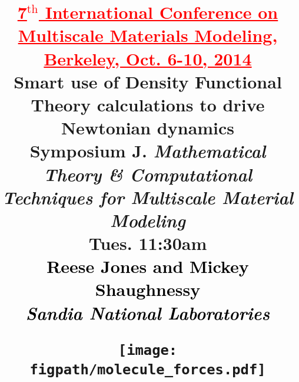 \documentclass{beamer}
\newcommand{\figpath}{../Figures/}
\newcommand{\red} [1]{\textcolor{red}{#1}}
\newcommand{\black}[1]{\textcolor{black}{#1}}
\begin{document}
\title{
\red{\underline{\tiny 7$^\text{th}$ International Conference on Multiscale Materials Modeling, Berkeley, Oct. 6-10, 2014}} \\
{\bf Smart use of Density Functional Theory calculations to drive Newtonian dynamics} \\
\vspace{-0.1in}
{\tiny Symposium J. \it Mathematical Theory \& Computational Techniques for Multiscale Material Modeling} \\
\vspace{-0.1in}
{\tiny Tues. 11:30am } \\
\vspace{-0.01in}
\large
\black{{\bf Reese Jones} and Mickey Shaughnessy} \\
\vspace{-0.01in}
\black{\it \small  Sandia National Laboratories}
\vspace{-0.1in}
\begin{center}
\texttt{[image: \\figpath/molecule\_forces.pdf]} \\
\end{center}
\date{}
}
\frame{\titlepage}
\end{document}
